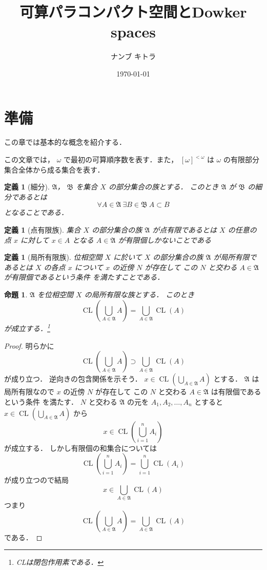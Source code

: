 \documentclass[leqno, 12pt]{ltjsarticle}
\title{可算パラコンパクト空間とDowker spaces}
\author{ナンブ キトラ}
\date{\today}
\newtheorem{prop}[thm]{命題}
\newtheorem{df}[thm]{定義}
\newcommand{\FinSubsets}[1]{[#1]^{<\omega}}
\newcommand{\dpst}{\displaystyle}
\DeclareMathOperator{\cl}{CL}
\begin{document}
\maketitle


\tableofcontents

\section{準備}
この章では基本的な概念を紹介する．


この文章では，
$\omega$
で最初の可算順序数を表す．また，
$\FinSubsets{\omega}$
は
$\omega$
の有限部分集合全体から成る集合を表す．




\begin{df}[細分]
$\mathfrak{A}$，
$\mathfrak{B}$
を集合
$X$
の部分集合の族とする．
このとき
$\mathfrak{A}$
が
$\mathfrak{B}$
の細分であるとは
\[
\forall A\in \mathfrak{A}\ \exists B\in \mathfrak{B}\ A\subset B
\]
となることである．
\end{df}

\begin{df}[点有限族]
集合
$X$
の部分集合の族
$\mathfrak{A}$
が点有限であるとは
$X$
の任意の点
$x$
に対して
$x\in A$
となる
$A\in \mathfrak{A}$
が有限個しかないことである
\end{df}



\begin{df}[局所有限族]
位相空間
$X$
に於いて
$X$
の部分集合の族
$\mathfrak{A}$
が局所有限であるとは
$X$
の各点
$x$
について
$x$
の近傍
$N$
が存在して
この
$N$
と交わる
$A\in\mathfrak{A}$
が有限個であるという条件
を満たすことである．
\end{df}




\begin{prop}\label{heihou}
$\mathfrak{A}$
を位相空間
$X$
の局所有限な族とする．
このとき
\[
\cl\left(\bigcup_{A\in \mathfrak{A}}A\right)=\bigcup_{A\in \mathfrak{A}}\cl(A)
\]
が成立する．\footnote{CLは閉包作用素である．}
\end{prop}
\begin{proof}
明らかに
\[
\cl\left(\bigcup_{A\in \mathfrak{A}}A\right)\supset \bigcup_{A\in \mathfrak{A}}\cl(A)
\]
が成り立つ．
逆向きの包含関係を示そう．
$\dpst x\in \cl\left(\bigcup_{A\in \mathfrak{A}}A\right)$
とする．
$\mathfrak{A}$
は局所有限なので
$x$
の近傍
$N$
が存在して
この
$N$
と交わる
$A\in \mathfrak{A}$
は有限個であるという条件
を満たす．
$N$
と交わる
$\mathfrak{A}$
の元を
$A_{1},A_{2},\dots,A_{n}$
とすると
$\dpst x\in \cl\left(\bigcup_{A\in \mathfrak{A}}A\right)$
から
\[
x\in \cl\left(\bigcup_{i=1}^{n}A_{i}\right)
\]
が成立する．
しかし有限個の和集合については
\[
\cl\left(\bigcup_{i=1}^{n}A_{i}\right)=\bigcup_{i=1}^{n}\cl(A_{i})
\]
が成り立つので結局
\[
x\in \bigcup_{A\in \mathfrak{A}}\cl(A)
\]
つまり
\[
\cl\left(\bigcup_{A\in \mathfrak{A}}A\right)=\bigcup_{A\in \mathfrak{A}}\cl(A)
\]
である．
\end{proof}
\end{document}
